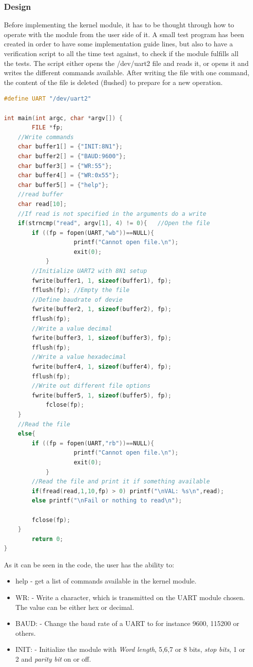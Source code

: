 \subsubsection{Design}
Before implementing the kernel module, it has to be thought through how to operate with the module from the user side of it. A small test program has been created in order to have some implementation guide lines, but also to have a verification script to all the time test against, to check if the module fulfills all the tests. 
\p The script either opens the /dev/uart2 file and reads it, or opens it and writes the different commands available. After writing the file with one command, the content of the file is deleted (flushed) to prepare for a new operation. 
\begin{lstlisting}[language=c]
#define UART "/dev/uart2"

int main(int argc, char *argv[]) {
        FILE *fp;
	//Write commands
	char buffer1[] = {"INIT:8N1"};
	char buffer2[] = {"BAUD:9600"};
	char buffer3[] = {"WR:55"};
	char buffer4[] = {"WR:0x55"};
	char buffer5[] = {"help"};
	//read buffer
	char read[10];
	//If read is not specified in the arguments do a write
	if(strncmp("read", argv[1], 4) != 0){	//Open the file
		if ((fp = fopen(UART,"wb"))==NULL){
                	printf("Cannot open file.\n");
               	 	exit(0);
        	}
		//Initialize UART2 with 8N1 setup
		fwrite(buffer1, 1, sizeof(buffer1), fp);
		fflush(fp); //Empty the file
		//Define baudrate of devie
		fwrite(buffer2, 1, sizeof(buffer2), fp);
		fflush(fp);
		//Write a value decimal
 		fwrite(buffer3, 1, sizeof(buffer3), fp);
		fflush(fp);
		//Write a value hexadecimal
 		fwrite(buffer4, 1, sizeof(buffer4), fp);
		fflush(fp);
		//Write out different file options
 		fwrite(buffer5, 1, sizeof(buffer5), fp);
        	fclose(fp);
	}
	//Read the file
	else{
		if ((fp = fopen(UART,"rb"))==NULL){
                	printf("Cannot open file.\n");
               	 	exit(0);
        	}
		//Read the file and print it if something available
		if(fread(read,1,10,fp) > 0) printf("\nVAL: %s\n",read);
		else printf("\nFail or nothing to read\n");

		fclose(fp);
	}
        return 0;
}
\end{lstlisting}
As it can be seen in the code, the user has the ability to:
\begin{itemize}
	\item help - get a list of commands available in the kernel module.
	\item WR: - Write a character, which is transmitted on the UART module chosen. The value can be either hex or decimal.
	\item BAUD: - Change the baud rate of a UART to for instance 9600, 115200 or others.
	\item INIT: - Initialize the module with \textit{Word length}, 5,6,7 or 8 bits, \textit{stop bits}, 1 or 2 and \textit{parity bit} on or off. 
\end{itemize}
